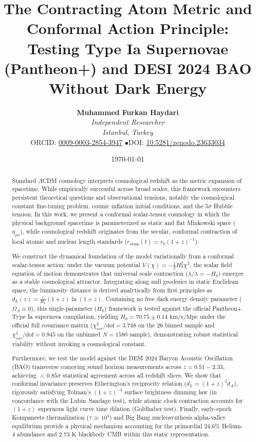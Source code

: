 \documentclass[11pt,a4paper]{article}
\title{\textbf{The Contracting Atom Metric and Conformal Action Principle: \\ Testing Type Ia Supernovae (Pantheon+) and DESI 2024 BAO Without Dark Energy}}
\author{
    \textbf{Muhammed Furkan Haydari} \\
    \textit{Independent Researcher} \\
    \textit{Istanbul, Turkey} \\
    \small ORCID: \href{https://orcid.org/0009-0003-2854-3947}{0009-0003-2854-3947} \quad$\bullet$\quad \small DOI: \href{https://doi.org/10.5281/zenodo.23633034}{10.5281/zenodo.23633034}
}
\date{\today}
\begin{document}
\maketitle

\begin{abstract}
    Standard $\Lambda$CDM cosmology interprets cosmological redshift as the metric expansion of spacetime. While empirically successful across broad scales, this framework encounters persistent theoretical questions and observational tensions, notably the cosmological constant fine-tuning problem, cosmic inflation initial conditions, and the $5\sigma$ Hubble tension. In this work, we present a conformal scalar-tensor cosmology in which the physical background spacetime is parameterized as static and flat Minkowski space ($\eta_{\mu\nu}$), while cosmological redshift originates from the secular, conformal contraction of local atomic and nuclear length standards ($r_{\mathrm{atom}}(t) = r_0 (1+z)^{-1}$).

    We construct the dynamical foundation of the model variationally from a conformal scalar-tensor action: under the vacuum potential $V(\chi) = -\frac{1}{2} H_0^2 \chi^2$, the scalar field equation of motion demonstrates that universal scale contraction ($\dot{\lambda}/\lambda = -H_0$) emerges as a stable cosmological attractor. Integrating along null geodesics in static Euclidean space, the luminosity distance is derived analytically from first principles as $d_L(z) = \frac{c}{H_0} (1+z) \ln(1+z)$. Containing no free dark energy density parameter ($\Omega_\Lambda \equiv 0$), this single-parameter ($H_0$) framework is tested against the official Pantheon+ Type Ia supernova compilation, yielding $H_0 = 70.75 \pm 0.14\text{ km/s/Mpc}$ under the official full covariance matrix ($\chi^2_{\mathrm{cov}}/\text{dof} = 3.748$ on the 26 binned sample and $\chi^2_{\mathrm{cov}}/\text{dof} = 0.945$ on the unbinned $N=1580$ sample), demonstrating robust statistical viability without invoking a cosmological constant.

    Furthermore, we test the model against the DESI 2024 Baryon Acoustic Oscillation (BAO) transverse comoving sound horizon measurements across $z = 0.51 - 2.33$, achieving $< 0.85\sigma$ statistical agreement across all redshift slices. We show that conformal invariance preserves Etherington's reciprocity relation ($d_L = (1+z)^2 d_A$), rigorously satisfying Tolman's $(1+z)^{-4}$ surface brightness dimming law (in concordance with the Lubin--Sandage test), while atomic clock contraction accounts for $(1+z)$ supernova light curve time dilation (Goldhaber test). Finally, early-epoch Kompaneets thermalization ($\tau \gg 10^4$) and Big Bang nucleosynthesis alpha-valley equilibrium provide a physical mechanism accounting for the primordial $24.6\%$ Helium-4 abundance and $2.73\text{ K}$ blackbody CMB within this static representation.
\end{abstract}
\end{document}
